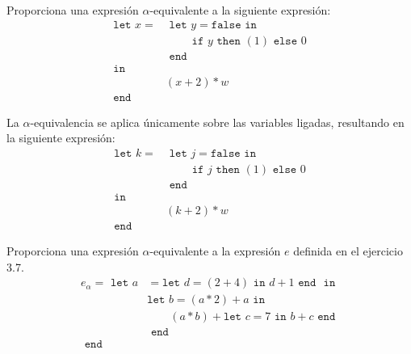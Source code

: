     \begin{exercise}
        Proporciona una expresión $\alpha$-equivalente a la siguiente expresión: 
	\begin{align*}
		\texttt{let  } x = & \texttt{ let } y = \texttt{false} \texttt{ in } \\ 
    		 				   & \qquad \texttt{ if } y \texttt{ then } (1) \texttt{ else } 0\\
						   & \texttt{ end}\\
         \texttt{in} & \\
           				   &  (x + 2) * w\\
          \texttt{end}&
    \end{align*}

	La $\alpha$-equivalencia se aplica únicamente sobre las variables ligadas, resultando en la siguiente expresión:
		\begin{align*}
		\texttt{let  } k = &\texttt{ let } j = \texttt{false} \texttt{ in } \\ 
    		 				   & \qquad \texttt{ if } j \texttt{ then } (1) \texttt{ else } 0\\
						   &\texttt{ end}\\
         \texttt{in }& \\
           				   &  (k + 2) * w\\
          \texttt{end}&
    \end{align*}
    \end{exercise}


    \begin{exercise}
        Proporciona una expresión $\alpha$-equivalente a la expresión $e$ definida en el ejercicio 3.7.
        \begin{align*}
        	e_\alpha = \texttt{ let  }
        		a&= \texttt{let }d = (2 + 4) \texttt{ in } d+1 \texttt{ end }
        		\texttt{ in }\\
        		 &\texttt{let }b=(a \ast 2)+a 
        		 	\texttt{ in } \\
        		 & \qquad(a\ast b) + \texttt{let }c=7 \texttt{ in } 
        		 						b+c 
        		 				\texttt{ end }\\
        		 &\texttt{ end }\\
        	\texttt{ end }&
        \end{align*}
    \end{exercise}

